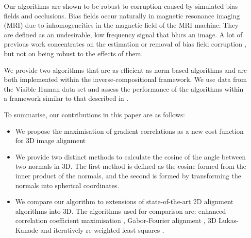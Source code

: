 Our algorithms are shown to be robust to corruption caused by simulated bias fields and occlusions. Bias fields occur naturally in magnetic resonance imaging (MRI) due to inhomogeneities in the magnetic field of the MRI machine. They are defined as an undesirable, low frequency signal that blurs an image. A lot of previous work concentrates on the estimation or removal of bias field corruption \cite{RefWorks:82, RefWorks:83}, but not on being robust to the effects of them.

We provide two algorithms that are as efficient as \ltwo norm-based algorithms and are both implemented within the inverse-compositional framework. We use data from the Visible Human data set \cite{RefWorks:81} and assess the performance of the algorithms within a framework similar to that described in \cite{RefWorks:10}.

To summarise, our contributions in this paper are as follows:

\begin{itemize}
    \item We propose the maximisation of gradient correlations as a new cost function for 3D image alignment
    \item We provide two distinct methods to calculate the cosine of the angle between two normals in 3D. The first method is defined as the cosine formed from the inner product of the normals, and the second is formed by transforming the normals into spherical coordinates.
    \item We compare our algorithm to extensions of state-of-the-art 2D alignment algorithms into 3D. The algorithms used for comparison are: enhanced correlation coefficient maximisation \cite{RefWorks:59}, Gabor-Fourier alignment \cite{RefWorks:73}, 3D Lukas-Kanade \cite{RefWorks:75} and iteratively re-weighted least squares \cite{RefWorks:76}.
\end{itemize}